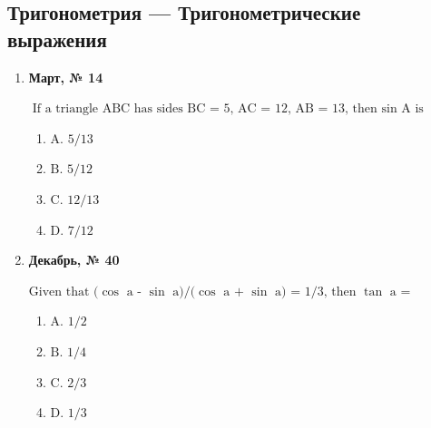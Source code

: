 \subsection*{Тригонометрия — Тригонометрические выражения}
\begin{enumerate}
\item \textbf{Март, № 14} \par \smallskip
$\displaystyle \text{If a triangle ABC has sides BC = 5, AC = 12, AB = 13, then }\sin\text{ A is}$
\begin{enumerate}
\item $\displaystyle \text{A. 5/13}$
\item $\displaystyle \text{B. 5/12}$
\item $\displaystyle \text{C. 12/13}$
\item $\displaystyle \text{D. 7/12}$
\end{enumerate}
\item \textbf{Декабрь, № 40} \par \smallskip
$\displaystyle \text{Given that (}\cos\text{ a - }\sin\text{ a)/(}\cos\text{ a + }\sin\text{ a) = 1/3, then }\tan\text{ a =}$
\begin{enumerate}
\item $\displaystyle \text{A. 1/2}$
\item $\displaystyle \text{B. 1/4}$
\item $\displaystyle \text{C. 2/3}$
\item $\displaystyle \text{D. 1/3}$
\end{enumerate}
\end{enumerate}

